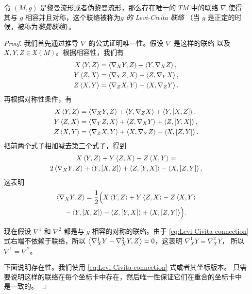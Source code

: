 \begin{theorem}[黎曼几何基本定理]\label{thm:Levi-Civita connection}
  令 $(M,g)$ 是黎曼流形或者伪黎曼流形，那么存在唯一的 $TM$ 中的联络
  $\nabla$ 使得其与 $g$ 相容并且对称，这个联络被称为\emph{$g$ 的 Levi-Civita 联络}
  （当 $g$ 是正定的时候，被称为\emph{黎曼联络}）。
\end{theorem}
\begin{proof}
  我们首先通过推导 $\nabla$ 的公式证明唯一性。假设 $\nabla$ 是这样的联络
  以及 $X,Y,Z\in \mathfrak{X}(M)$。根据相容性，我们有
  \begin{align*}
    X\left\langle Y,Z\right\rangle&=\left\langle \nabla_XY,Z\right\rangle+\left\langle Y,\nabla_XZ\right\rangle,\\
    Y\left\langle Z,X\right\rangle&=\left\langle \nabla_YZ,X\right\rangle+\left\langle Z,\nabla_YX\right\rangle,\\
    Z\left\langle X,Y\right\rangle&=\left\langle \nabla_ZX,Y\right\rangle+\left\langle X,\nabla_ZY\right\rangle.
  \end{align*}
  再根据对称性条件，有
  \begin{align*}
    X\left\langle Y,Z\right\rangle&=\left\langle \nabla_XY,Z\right\rangle+\left\langle Y,\nabla_ZX\right\rangle+\left\langle Y,[X,Z]\right\rangle,\\
    Y\left\langle Z,X\right\rangle&=\left\langle \nabla_YZ,X\right\rangle+\left\langle Z,\nabla_XY\right\rangle+\left\langle Z,[Y,X]\right\rangle,\\
    Z\left\langle X,Y\right\rangle&=\left\langle \nabla_ZX,Y\right\rangle+\left\langle X,\nabla_YZ\right\rangle+\left\langle X,[Z,Y]\right\rangle.
  \end{align*}
  把前两个式子相加减去第三个式子，得到
  \begin{multline*}
    X\left\langle Y,Z\right\rangle+Y\left\langle Z,X\right\rangle-Z\left\langle X,Y\right\rangle=\\
    2\left\langle \nabla_XY,Z\right\rangle+\left\langle Y,[X,Z]\right\rangle+\left\langle Z,[Y,X]\right\rangle-
    \left\langle X,[Z,Y]\right\rangle,
  \end{multline*}
  这表明
  \begin{multline}\label{eq:Levi-Civita connection}
    \left\langle \nabla_XY,Z\right\rangle=\frac{1}{2}\Bigl(X\left\langle Y,Z\right\rangle+Y\left\langle Z,X\right\rangle-Z\left\langle X,Y\right\rangle\\
    -\left\langle Y,[X,Z]\right\rangle-\left\langle Z,[Y,X]\right\rangle+
    \left\langle X,[Z,Y]\right\rangle\Bigr).
  \end{multline}

  现在假设 $\nabla^1$ 和 $\nabla^2$ 都是与 $g$ 相容的对称的联络。由于
  \eqref{eq:Levi-Civita connection} 式右端不依赖于联络，所以
  $\left\langle \nabla_X^1Y-\nabla_X^2Y,Z\right\rangle=0$，这表明 $\nabla_X^1Y=\nabla_X^2Y$，
  所以 $\nabla^1=\nabla^2$。

  下面说明存在性。我们使用 \eqref{eq:Levi-Civita connection} 式或者其坐标版本。
  只需要说明这样的联络在每个坐标卡中存在，然后唯一性保证它们在重合的坐标卡中
  是一致的。


\end{proof}
